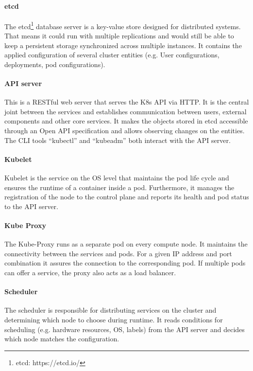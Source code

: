\paragraph*{etcd}
The etcd\footnote{etcd: https://etcd.io/} database server is a key-value store designed for distributed systems\cite{Luksa.2018}. That means it could run with multiple replications and would still be able to keep a persistent storage synchronized across multiple instances. It contains the applied configuration of several cluster entities (e.g. User configurations, deployments, pod configurations).

\paragraph*{API server}
This is a RESTful web server that serves the \ac{K8s} \ac{API} via \ac{HTTP}\cite{Kubernetes.20221024}. It is the central joint between the services and establishes communication between users, external components and other core services. It makes the objects stored in etcd accessible through an Open \ac{API} specification\cite{Luksa.2018,OpenAPIInitiative.20230210} and allows observing changes on the entities. The \ac{CLI} tools \enquote{kubectl} and \enquote{kubeadm} both interact with the \ac{API} server.

\paragraph*{Kubelet} Kubelet is the service on the \ac{OS} level that maintains the pod life cycle and ensures the runtime of a container inside a pod. Furthermore, it manages the registration of the node to the control plane and reports its health and pod status to the \ac{API} server.

\paragraph*{Kube Proxy} The Kube-Proxy runs as a separate pod on every compute node. It maintains the connectivity between the services and pods\cite{Luksa.2018}. For a given \ac{IP} address and port combination it assures the connection to the corresponding pod. If multiple pods can offer a service, the proxy also acts as a load balancer\cite{Luksa.2018}.

\paragraph*{Scheduler} The scheduler is responsible for distributing services on the cluster and determining which node to choose during runtime. It reads conditions for scheduling (e.g. hardware resources, \ac{OS}, labels) from the \ac{API} server and decides which node matches the configuration\cite{Luksa.2018}.

